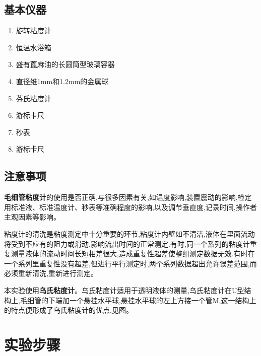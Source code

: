 \documentclass[12pt,a4paper]{ctexart}
\begin{document}
\subsection{基本仪器}
\begin{enumerate}
	\item 旋转粘度计
	\item 恒温水浴箱
	\item 盛有蓖麻油的长圆筒型玻璃容器
	\item 直径维1mm和1.2mm的金属球
	\item 芬氏粘度计
	\item 游标卡尺
	\item 秒表
	\item 游标卡尺
\end{enumerate}
\subsection{注意事项}
\textbf{毛细管粘度计}的使用是否正确,与很多因素有关,如温度影响,装置震动的影响,检定用标准液、标准温度计、秒表等准确程度的影响,以及调节垂直度,记录时间,操作者主观因素等影响。

粘度计的清洗是粘度测定中十分重要的环节,粘度计内壁如不清洁,液体在里面流动将受到不应有的阻力或滑动,影响流出时间的正常测定.有时,同一个系列的粘度计重复测量液体的流动时间长短相差很大,造成重复性超差使整组测定数据无效.有时在一个系列里重复性没有超差,但进行平行测定时,两个系列数据超出允许误差范围,而必须重新清洗,重新进行测定。


本实验使用\textbf{乌氏粘度计}。乌氏粘度计适用于透明液体的测量,乌氏粘度计在U型结构上,毛细管的下端加一个悬挂水平球,悬挂水平球的左上方接一个管M,这一结构上的特点便形成了乌氏粘度计的优点,见图。


\section{实验步骤}\label{ux5b9eux9a8cux6b65ux9aa4}
\end{document}
